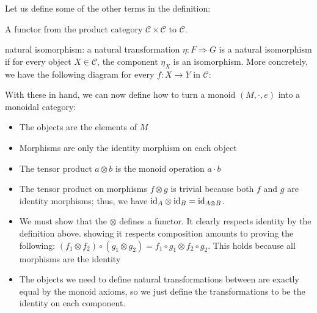Let us define some of the other terms in the definition:

\begin{definition}[bifunctor]
A functor from the product category \(\mathcal{C} \times \mathcal{C}\) 
to \(\mathcal{C}\).
\end{definition}

\begin{definition}
natural isomorphism: a natural transformation \(\eta : F \Rightarrow G\)
is a natural isomorphism if for every object \(X \in \mathcal{C}\), the
component \(\eta_X\) is an isomorphism. More concretely, we have the
following diagram for every $f : X \to Y$ in $\mathcal{C}$:

\end{definition}

With these in hand, we can now define how to turn a monoid
\((M, \cdot, e)\) into a monoidal category:
\begin{itemize}
    \item The objects are the elements of $M$
    \item Morphisms are only the identity morphism on each object
    \item The tensor product $a \otimes b$ is the monoid operation 
        $a \cdot b$
    \item The tensor product on morphisms $f \otimes g$ is trivial
        because both $f$ and $g$ are identity morphisms; thus, we
        have $\text{id}_A \otimes \text{id}_B = \operatorname{id}_{A \otimes B}$.
    \item We must show that the \(\otimes\) defines a functor. It clearly
        respects identity by the definition above. showing it respects
        composition amounts to proving the following:
        \((f_1 \otimes f_2) \circ (g_1 \otimes g_2) 
        =  f_1 \circ g_1 \otimes f_2 \circ g_2\).
        This holds because all morphisms are the identity 
    \item The objects we need to define natural transformations between are
        exactly equal by the monoid axioms, so we just define the transformations 
        to be the identity on each component.
\end{itemize}


